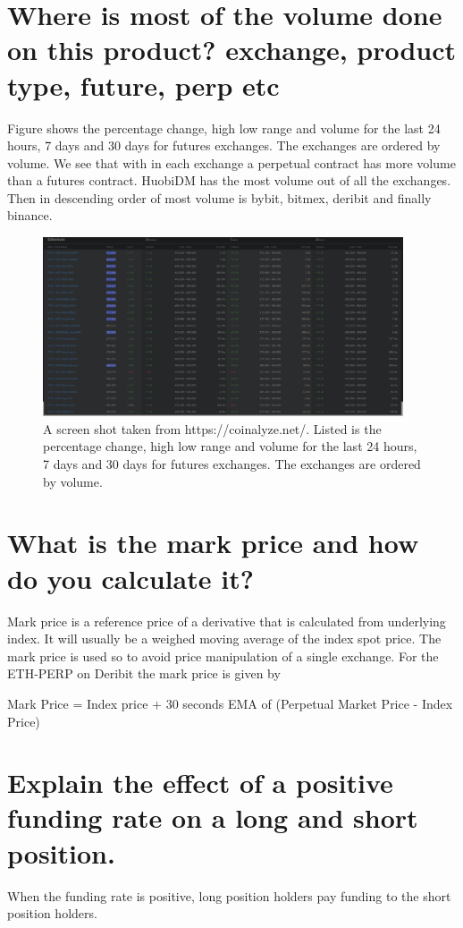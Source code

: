\section{ Where is most of the volume done on this product? exchange, product type, future, perp etc}
Figure shows the percentage change, high low range and volume for the last 24 hours, 7 days and 30 days for futures exchanges.  The exchanges are ordered by volume. 
We see that with in each exchange a perpetual contract has more volume than a futures contract. HuobiDM has the most volume out of all the exchanges. Then in descending order of most volume is bybit, bitmex, deribit and finally binance.
\begin{figure}\label{fig:vol}
\center
\includegraphics[width=0.95\textwidth]{fig/vol.png}
\caption{A screen shot taken from https://coinalyze.net/. Listed is the percentage change, high low range and volume for the last 24 hours, 7 days and 30 days for futures exchanges.  The exchanges are ordered by volume.}
\end{figure}
\section{ What is the mark price and how do you calculate it?}
Mark price is a reference price of a derivative that is calculated from underlying index. It will usually be a weighed moving average of the index spot price. The mark price is used so to avoid price manipulation of a single exchange. For the ETH-PERP on Deribit \cite{perp} the mark price is given by 


Mark Price = Index price + 30 seconds EMA of (Perpetual Market Price - Index Price)

\section{ Explain the effect of a positive funding rate on a long and short position.}
When the funding rate is positive, long position holders pay funding to the short position holders.

